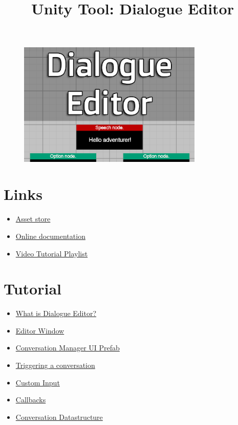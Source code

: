 \documentclass[a4paper,12pt]{article}
\begin{document}
\title{Unity Tool: Dialogue Editor\vspace{-50pt}}
\date{}
\maketitle

\begin{figure}[ht]
\centering
\includegraphics[width=250pt, keepaspectratio]{img/CardImage.png}
\end{figure}

\section{Links}
\begin{itemize}
\setlength\itemsep{1pt}
	\item \href{https://assetstore.unity.com/packages/tools/utilities/dialogue-editor-168329}{Asset store}
	\item \href{https://josephbarber96.github.io/dialogueeditor.html}{Online documentation}
	\item \href{https://www.youtube.com/playlist?list=PLfRF6lnXtGqjrhzyQhidqMD-shMHGReXi}{Video Tutorial Playlist}
\end{itemize}


\section{Tutorial}
\begin{itemize}
\setlength\itemsep{1pt}
	\item \hyperlink{_whatis}{What is Dialogue Editor?}
	\item \hyperlink{_editorwindow}{Editor Window}
	\item \hyperlink{_conversationmanager}{Conversation Manager UI Prefab}
	\item \hyperlink{_triggering}{Triggering a conversation}
	\item \hyperlink{_custominput}{Custom Input}
	\item \hyperlink{_callbacks}{Callbacks}
	\item \hyperlink{_datastructure}{Conversation Datastructure}
\end{itemize}
\end{document}
